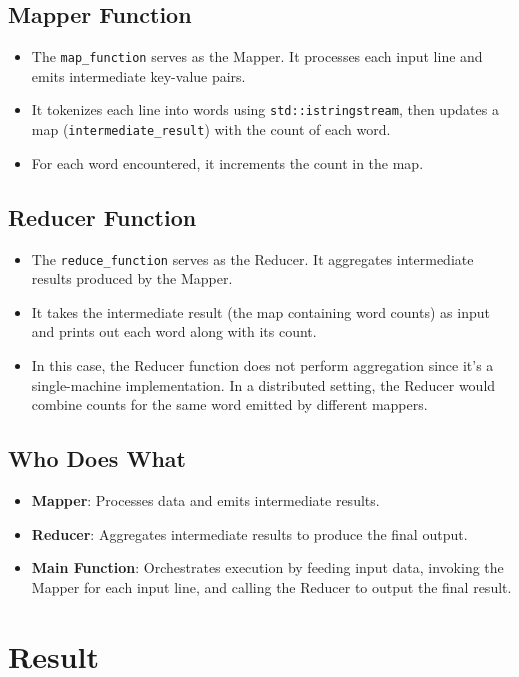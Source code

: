\documentclass{article}
\begin{document}
\subsection{Mapper Function}
\begin{itemize}
    \item The \texttt{map\_function} serves as the Mapper. It processes each input line and emits intermediate key-value pairs.
    \item It tokenizes each line into words using \texttt{std::istringstream}, then updates a map (\texttt{intermediate\_result}) with the count of each word.
    \item For each word encountered, it increments the count in the map.
\end{itemize}

\subsection{Reducer Function}
\begin{itemize}
    \item The \texttt{reduce\_function} serves as the Reducer. It aggregates intermediate results produced by the Mapper.
    \item It takes the intermediate result (the map containing word counts) as input and prints out each word along with its count.
    \item In this case, the Reducer function does not perform aggregation since it's a single-machine implementation. In a distributed setting, the Reducer would combine counts for the same word emitted by different mappers.
\end{itemize}

\subsection{Who Does What}
\begin{itemize}
    \item \textbf{Mapper}: Processes data and emits intermediate results.
    \item \textbf{Reducer}: Aggregates intermediate results to produce the final output.
    \item \textbf{Main Function}: Orchestrates execution by feeding input data, invoking the Mapper for each input line, and calling the Reducer to output the final result.
\end{itemize}

\section{Result}
\end{document}
